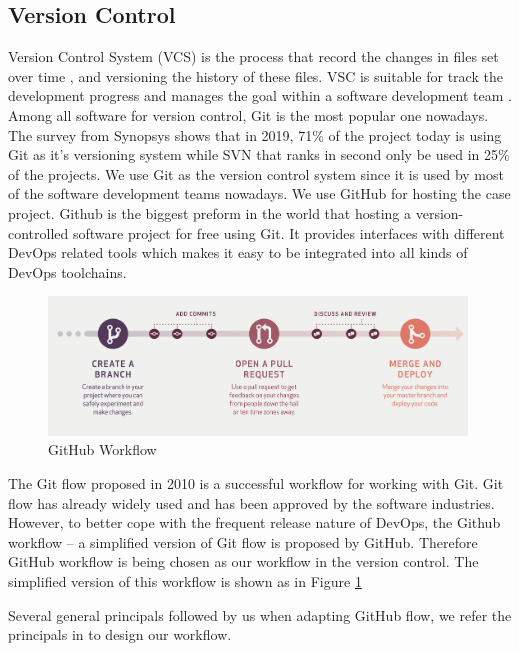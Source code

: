 \subsection{Version Control}
Version Control System (VCS) is the process that record the changes in files set over time \cite{GitAbout93:online}, and versioning the history of these files. VSC is suitable for track the development progress and manages the goal within a software development team \cite{loeliger2012version}. Among all software for version control, Git is the most popular one nowadays. The survey \cite{CompareR31:online} from Synopsys shows that in 2019, 71\% of the project today is using Git as it's versioning system while SVN that ranks in second only be used in 25\% of the projects. We use Git as the version control system since it is used by most of the software development teams nowadays. We use GitHub for hosting the case project. Github is the biggest preform in the world that hosting a version-controlled software project for free using Git. It provides interfaces with different DevOps related tools which makes it easy to be integrated into all kinds of DevOps toolchains.
\begin{figure}[h]
    \centering
    \includegraphics[width=0.99\textwidth]{pics/git.png}
    \caption{GitHub Workflow \cite{guides2013understanding}}
    \label{fig:git}
\end{figure}
\par
The Git flow \cite{driessen2010successful} proposed in 2010 is a successful workflow for working with Git. Git flow has already widely used and has been approved by the software industries. However, to better cope with the frequent release nature of DevOps, the Github workflow -- a simplified version of Git flow is proposed by GitHub.
Therefore GitHub workflow \cite{chacongithub} is being chosen as our workflow in the version control. The simplified version of this workflow is shown as in Figure \ref{fig:git}
\par
Several general principals followed by us when adapting GitHub flow, we refer the principals in \cite{chacongithub} to design our workflow.
